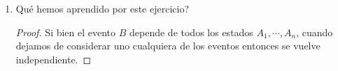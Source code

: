 \documentclass[paper=letter, fontsize=11pt]{scrartcl} %
\numberwithin{equation}{section} %
\numberwithin{figure}{section} %
\numberwithin{table}{section} %
\newcommand{\prob}[1]{\mathbb{P}(#1)}
\begin{document}
\begin{enumerate}[label = \arabic*)]
\begin{proof}
De nuevo por la definición de probabilidad condicional tenemos que $ \prob{A_{i_{1}} \cap \cdots \cap A_{i_{n-1}} \cap B} = \prob{B|A_{i_{1}} \cap \cdots \cap A_{i_{n-1}}}\prob{A_{i_{1}} \cap \cdots \cap A_{i_{n-1}}} $. Y como la familia de $ A_i $'s es independiente tenemos que esto es igual a  
$ \displaystyle \prob{A_{i_{1}} \cap \cdots \cap A_{i_{n-1}} \cap B} = \prob{B|A_{i_{1}} \cap \cdots \cap A_{i_{n-1}}} \prob{A_{i_1}} \cdots \prob{A_{i_{n-1}}} = \underbrace{\frac{1}{2}\cdots \frac{1}{2}}_{n-1\text{ veces}}\frac{1}{2} = \frac{1}{2^n}$ 

Entonces vemos que en este caso si coincide con lo predicho por la fórmula inicial. Por lo tanto si es independiente. Luego en nuestro modelo podemos reemplazar cualquiera de las variables $ X_i $ por $ Y $ y el modelo no cambiaria.
\end{proof}

\item Qué hemos aprendido por este ejercicio?
\begin{proof}
Si bien el evento $ B $ depende de todos los estados $ A_1, \cdots ,A_n $, cuando dejamos de considerar uno cualquiera de los eventos entonces se vuelve independiente.
\end{proof}
\end{enumerate}
\end{document}
